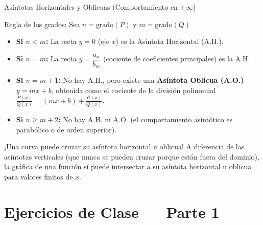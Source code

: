 \documentclass[aspectratio=169]{beamer}
\begin{document}
\begin{frame}{Asíntotas Horizontales y Oblicuas (Comportamiento en $\pm\infty$)}
  \begin{block}{Regla de los grados: Sea $n = \text{grado}(P)$ y $m = \text{grado}(Q)$}
    \begin{itemize}
      \item \textbf{Si $n < m$:} La recta \textbf{$y = 0$} (eje $x$) es la Asíntota Horizontal (A.H.).
      \item \textbf{Si $n = m$:} La recta \textbf{$y = \dfrac{a_n}{b_m}$} (cociente de coeficientes principales) es la A.H.
      \item \textbf{Si $n = m + 1$:} No hay A.H., pero existe una \textbf{Asíntota Oblicua (A.O.)} $y = mx + b$, obtenida como el cociente de la división polinomial $\frac{P(x)}{Q(x)} = (mx + b) + \frac{R(x)}{Q(x)}$.
      \item \textbf{Si $n \ge m + 2$:} No hay A.H. ni A.O. (el comportamiento asintótico es parabólico o de orden superior).
    \end{itemize}
  \end{block}

  \vspace{4pt}
  \begin{alertblock}{¡Una curva puede cruzar su asíntota horizontal u oblicua!}
    A diferencia de las asíntotas verticales (que nunca se pueden cruzar porque están fuera del dominio), la gráfica de una función sí puede intersectar a su asíntota horizontal u oblicua para valores finitos de $x$.
  \end{alertblock}
\end{frame}



\section{Ejercicios de Clase — Parte 1}
\end{document}
